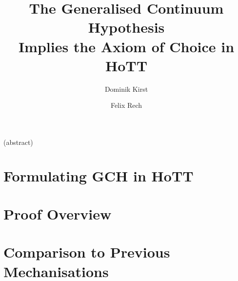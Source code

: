 \documentclass{easychair}
\title{The Generalised Continuum Hypothesis\\Implies the Axiom of Choice in HoTT}
\author{Dominik Kirst \and Felix Rech}
\institute{Saarland University, Saarland Informatics Campus, Germany}
\begin{document}
\maketitle

(abstract)

\cite{kirst2021generalised}

\section{Formulating GCH in HoTT}

\section{Proof Overview}

\section{Comparison to Previous Mechanisations}



\scriptsize{}
\vspace{-20em}
\end{document}
